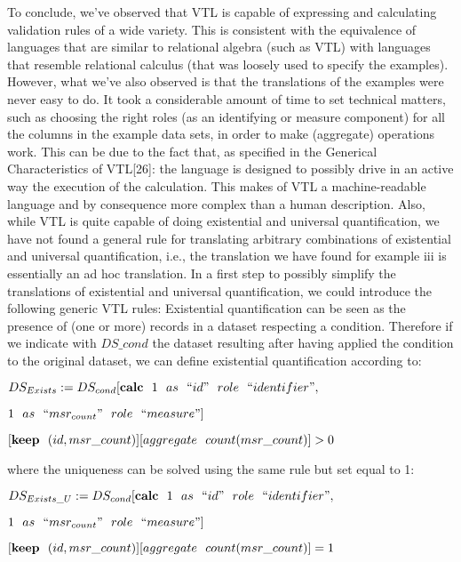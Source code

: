 To conclude, we've observed that VTL is capable of expressing and calculating validation rules of a wide variety.  This is consistent with the equivalence of languages that are similar to relational algebra (such as VTL) with languages that resemble relational calculus (that was loosely used to specify the examples).  However, what we've also observed is that the translations of the examples were never easy to do.  It took a considerable amount of time to set technical matters, such as choosing the right roles (as an identifying or measure component) for all the columns in the example data sets, in order to make (aggregate) operations work.  This can be due to the fact that, as specified in the Generical Characteristics of VTL[26]:  the language is designed to possibly drive in an active way the execution of the calculation. This makes of VTL a machine-readable language and by consequence more complex than a human description. Also, while VTL is quite capable of doing existential and universal quantification, we have not found a general rule for translating arbitrary combinations of existential and universal quantification, i.e., the translation we have found for example iii is essentially an ad hoc translation. In a first step to possibly simplify the translations of existential and universal quantification, we could introduce the following generic VTL rules: Existential quantification can be seen as the presence of (one or more) records in a dataset respecting a condition. Therefore if we indicate with $DS\_{cond}$ the  dataset resulting after having applied the condition to the
original dataset, we can define existential quantification according to:

\bigskip
 $  DS_{Exists}:=DS_{cond}[\bold{calc} \ \ 1 \ \ as  \ \ ``id"  \ \ role  \ \ ``identifier" , $

\hskip 2cm  $  1 \ \ as  \ \ ``msr_{count}"  \ \ role  \ \ ``measure"] $  


\hskip 2cm $ [\bold{keep} \ \ (id, msr\_{count})][aggregate\ \ count(msr\_{count})]>0$ 

\bigskip\noindent
where the uniqueness can be solved using the same rule but set equal to 1:

\bigskip
 $  DS_{Exists\_U}:=DS_{cond}[\bold{calc} \ \ 1 \ \ as  \ \ ``id"  \ \ role  \ \ ``identifier" , $

\hskip 2cm  $  1 \ \ as  \ \ ``msr_{count}"  \ \ role  \ \ ``measure"] $  


\hskip 2cm $ [\bold{keep} \ \ (id, msr\_{count})][aggregate\ \ count(msr\_{count})]=1$ 

